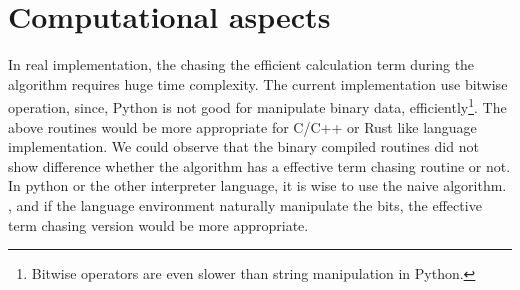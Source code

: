 \documentclass[twocolumn]{article}
\begin{document}
\section{Computational aspects}
In real implementation, the chasing the efficient calculation term during 
the algorithm requires huge time complexity.
The current implementation use bitwise operation, since, Python is not good for 
manipulate binary data, efficiently\footnote{Bitwise operators are even slower than string manipulation in Python.}. 
The above routines would be more appropriate for C/C++ or Rust like language implementation.
We could observe that the binary compiled routines did not show difference 
whether the algorithm has a effective term chasing routine or not.
In python or the other interpreter language, it is wise to use the naive algorithm.
, and if the language environment naturally manipulate the bits, the effective term chasing version
would be more appropriate.

\end{document}
